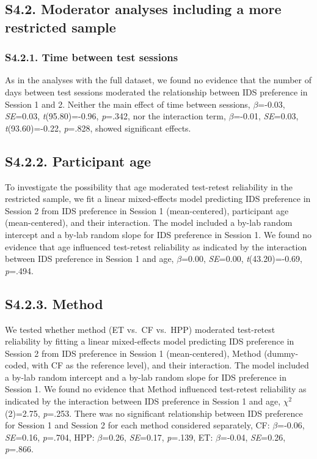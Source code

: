 \documentclass[
  english,
  man, donotrepeattitle,floatsintext]{apa6}
\begin{document}
\hypertarget{s4.2.-moderator-analyses-including-a-more-restricted-sample}{%
\subsection{S4.2. Moderator analyses including a more restricted sample}\label{s4.2.-moderator-analyses-including-a-more-restricted-sample}}

\hypertarget{s4.2.1.-time-between-test-sessions}{%
\subsubsection{S4.2.1. Time between test sessions}\label{s4.2.1.-time-between-test-sessions}}

As in the analyses with the full dataset, we found no evidence that the number of days between test sessions moderated the relationship between IDS preference in Session 1 and 2. Neither the main effect of time between sessions, \(\beta\)=-0.03, \emph{SE}=0.03, \emph{t}(95.80)=-0.96, \emph{p}=.342, nor the interaction term, \(\beta\)=-0.01, \emph{SE}=0.03, \emph{t}(93.60)=-0.22, \emph{p}=.828, showed significant effects.

\hypertarget{s4.2.2.-participant-age}{%
\subsection{S4.2.2. Participant age}\label{s4.2.2.-participant-age}}

To investigate the possibility that age moderated test-retest reliability in the restricted sample, we fit a linear mixed-effects model predicting IDS preference in Session 2 from IDS preference in Session 1 (mean-centered), participant age (mean-centered), and their interaction.
The model included a by-lab random intercept and a by-lab random slope for IDS preference in Session 1.
We found no evidence that age influenced test-retest reliability as indicated by the interaction between IDS preference in Session 1 and age, \(\beta\)=0.00, \emph{SE}=0.00, \emph{t}(43.20)=-0.69, \emph{p}=.494.

\hypertarget{s4.2.3.-method}{%
\subsection{S4.2.3. Method}\label{s4.2.3.-method}}

We tested whether method (ET vs.~CF vs.~HPP) moderated test-retest reliability by fitting a linear mixed-effects model predicting IDS preference in Session 2 from IDS preference in Session 1 (mean-centered), Method (dummy-coded, with CF as the reference level), and their interaction.
The model included a by-lab random intercept and a by-lab random slope for IDS preference in Session 1.
We found no evidence that Method influenced test-retest reliability as indicated by the interaction between IDS preference in Session 1 and age, \({\chi}^2\)(2)=2.75, \emph{p}=.253. There was no significant relationship between IDS preference for Session 1 and Session 2 for each method considered separately, CF: \(\beta\)=-0.06, \emph{SE}=0.16, \emph{p}=.704, HPP: \(\beta\)=0.26, \emph{SE}=0.17, \emph{p}=.139, ET: \(\beta\)=-0.04, \emph{SE}=0.26, \emph{p}=.866.
\end{document}
